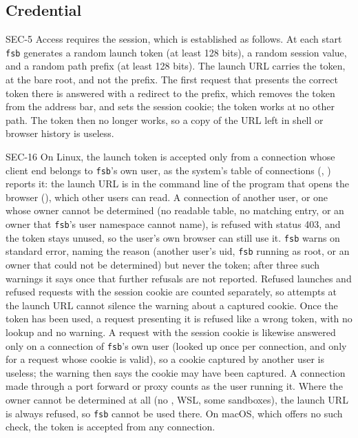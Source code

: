 \subsection{Credential}

\begin{req}{SEC-5}
Access requires the session, which is established as follows.  At each start
\texttt{fsb} generates a random launch token (at least 128 bits), a random session
value, and a random path prefix (at least 128 bits).  The launch URL carries the
token, at the bare root, and not the prefix.  The first request that presents the
correct token there is answered with a redirect to the prefix, which removes the
token from the address bar, and sets the session cookie; the token works at no
other path.
The token then no longer works, so a copy of the URL left in shell or browser
history is useless.
\end{req}

\begin{req}{SEC-16}
On Linux, the launch token is accepted only from a connection whose client end
belongs to \texttt{fsb}'s own user, as the system's table of connections
(, ) reports it: the launch URL is in the
command line of the program that opens the browser (), which other users
can read.  A connection of another user, or one whose owner cannot be determined
(no readable table, no matching entry, or an owner that \texttt{fsb}'s user
namespace cannot name), is refused with status 403, and the token stays unused, so
the user's own browser can still use it.  \texttt{fsb} warns on standard error,
naming the reason (another user's uid, \texttt{fsb} running as root, or an owner
that could not be determined) but never the token; after three such warnings it
says once that further refusals are not reported.  Refused launches and refused
requests with the session cookie are counted separately, so attempts at the
launch URL cannot silence the warning about a captured cookie.  Once the token has been used, a
request presenting it is refused like a wrong token, with no lookup and no warning.
A request with the session cookie is likewise answered only on a connection of
\texttt{fsb}'s own user (looked up once per connection, and only for a request
whose cookie is valid), so a cookie captured by another user is useless; the
warning then says the cookie may have been captured.
A connection made through a port forward or proxy counts as the user running it.
Where the owner cannot be determined at all (no , WSL, some sandboxes),
the launch URL is always refused, so \texttt{fsb} cannot be used there.  On macOS,
which offers no such check, the token is accepted from any connection.
\end{req}

